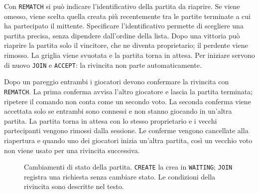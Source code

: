\documentclass[11pt,a4paper]{article}
\begin{document}
Con \texttt{REMATCH} si può indicare l'identificativo della partita da riaprire. Se viene omesso, viene scelta quella creata più recentemente tra le partite terminate a cui ha partecipato il mittente. Specificare l'identificativo permette di scegliere una partita precisa, senza dipendere dall'ordine della lista. Dopo una vittoria può riaprire la partita solo il vincitore, che ne diventa proprietario; il perdente viene rimosso. La griglia viene svuotata e la partita torna in attesa. Per iniziare servono di nuovo \texttt{JOIN} e \texttt{ACCEPT}: la rivincita non parte automaticamente.

Dopo un pareggio entrambi i giocatori devono confermare la rivincita con \texttt{REMATCH}. La prima conferma avvisa l'altro giocatore e lascia la partita terminata; ripetere il comando non conta come un secondo voto. La seconda conferma viene accettata solo se entrambi sono connessi e non stanno giocando in un'altra partita. La partita torna in attesa con lo stesso proprietario e i vecchi partecipanti vengono rimossi dalla sessione. Le conferme vengono cancellate alla riapertura e quando uno dei giocatori inizia un'altra partita, così un vecchio voto non viene usato per una rivincita successiva.

\begin{figure}[ht]
\centering
{}
\caption{Cambiamenti di stato della partita. \texttt{CREATE} la crea in
\texttt{WAITING}; \texttt{JOIN} registra una richiesta senza cambiare stato.
Le condizioni della rivincita sono descritte nel testo.}
\label{fig:game-states}
\end{figure}
\end{document}
